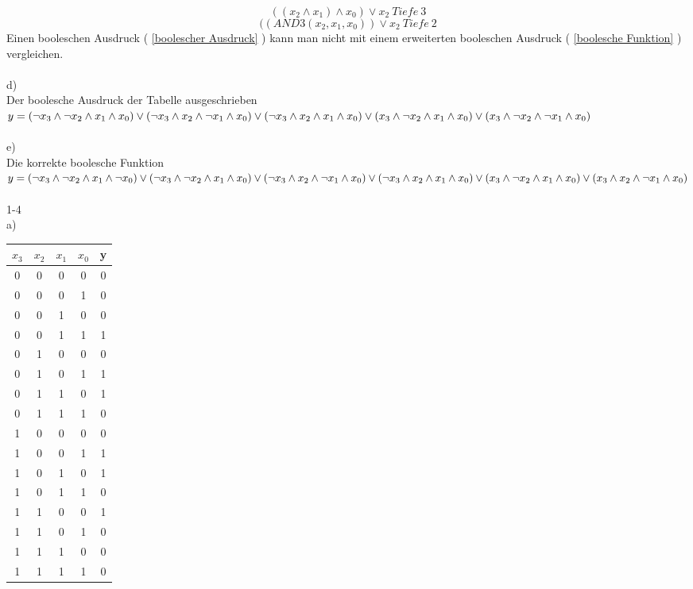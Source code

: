 \documentclass[11pt,a4paper]{article}
\begin{document}
\begin{equation}
\label{boolescher Ausdruck}
(( x_2 \wedge x_1 ) \wedge x_0 ) \vee x_2~Tiefe~3
\end{equation}
\begin{equation}
\label{boolesche Funktion}
((AND3(x_2,x_1,x_0))\vee x_2~Tiefe~2
\end{equation}
Einen booleschen Ausdruck ( \ref{boolescher Ausdruck} ) kann man nicht mit einem erweiterten booleschen Ausdruck  ( \ref{boolesche Funktion} ) vergleichen. \\ \\
d)\\
Der boolesche Ausdruck der Tabelle ausgeschrieben\\
$
y=( \neg x_3 \wedge \neg x_2 \wedge x_1 \wedge x_0) \vee  ( \neg x_3 \wedge x_2 \wedge \neg x_1 \wedge x_0 ) \vee  ( \neg x_3 \wedge x_2 \wedge x_1 \wedge x_0  ) \vee \\
( x_3 \wedge \neg x_2 \wedge x_1 \wedge x_0 ) \vee ( x_3 \wedge \neg x_2 \wedge \neg x_1 \wedge x_0 )
$
\\ \\
e)\\
Die korrekte boolesche Funktion \\
$
y=( \neg x_3 \wedge \neg x_2 \wedge x_1 \wedge \neg x_0 ) \vee ( \neg x_3 \wedge \neg x_2 \wedge x_1 \wedge x_0) \vee ( \neg x_3 \wedge x_2 \wedge \neg x_1 \wedge x_0) \vee \\ ( \neg x_3 \wedge x_2 \wedge x_1 \wedge x_0) \vee ( x_3 \wedge \neg x_2 \wedge x_1 \wedge x_0) \vee (x_3 \wedge x_2 \wedge \neg x_1 \wedge x_0)$\\
\\
1-4\\
a)\\
\begin{tabular}{c | c | c | c | c}
$x_3$&$x_2$&$x_1$&$x_0$&y\\ \hline
0&0&0&0&0\\
0&0&0&1&0\\
0&0&1&0&0\\
0&0&1&1&1\\ \hline
0&1&0&0&0\\
0&1&0&1&1\\
0&1&1&0&1\\
0&1&1&1&0\\ \hline
1&0&0&0&0\\
1&0&0&1&1\\
1&0&1&0&1\\
1&0&1&1&0\\ \hline
1&1&0&0&1\\
1&1&0&1&0\\
1&1&1&0&0\\
1&1&1&1&0\\
\end{tabular}\\ \\
\end{document}
